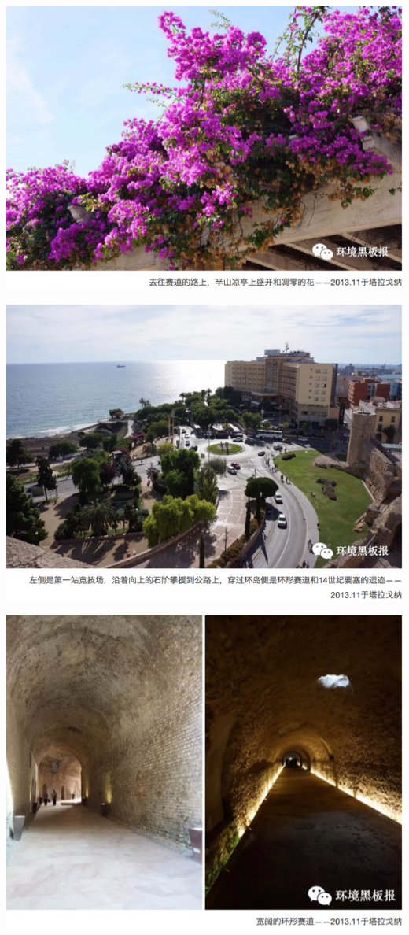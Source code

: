\documentclass[
]{book}
\begin{document}
\includegraphics[width=8.33in]{images/xt32}

\includegraphics[width=8.33in]{images/xt33}

\includegraphics[width=8.33in]{images/xt34}
\end{document}
